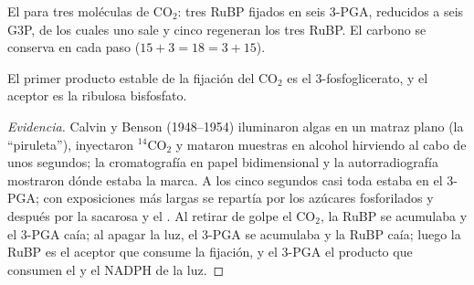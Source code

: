 \begin{omfigure}

{\small El  para tres moléculas de $\mathrm{CO_2}$: tres RuBP
fijados en seis 3-PGA, reducidos a seis G3P, de los cuales uno sale y cinco
regeneran los tres RuBP. El carbono se conserva en cada paso
($15 + 3 = 18 = 3 + 15$).}
\end{omfigure}

\begin{proposition}\label{prop:b1:photosynthesis:calvin}
El primer producto estable de la fijación del $\mathrm{CO_2}$ es el
3-fosfoglicerato, y el aceptor es la ribulosa bisfosfato.
\end{proposition}
\begin{proof}[Evidencia]
Calvin y Benson (1948--1954) iluminaron algas en un matraz plano (la
``piruleta''), inyectaron $\mathrm{^{14}CO_2}$ y mataron muestras en alcohol
hirviendo al cabo de unos segundos; la cromatografía en papel bidimensional
y la autorradiografía mostraron dónde estaba la marca. A los cinco segundos
casi toda estaba en el 3-PGA; con exposiciones más largas se repartía por
los azúcares fosforilados y después por la sacarosa y el . Al retirar
de golpe el $\mathrm{CO_2}$, la RuBP se acumulaba y el 3-PGA caía; al apagar
la luz, el 3-PGA se acumulaba y la RuBP caía; luego la RuBP es el aceptor
que consume la fijación, y el 3-PGA el producto que consumen el  y el
NADPH de la luz.
\end{proof}

